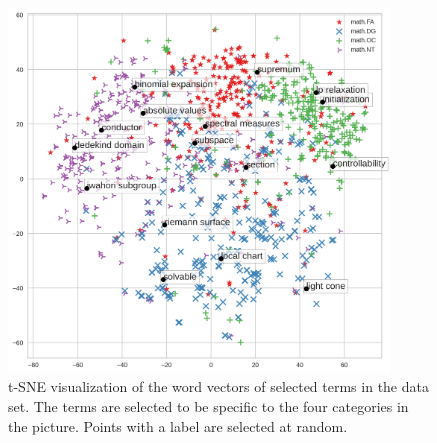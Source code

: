 \documentclass[submission,copyright,creativecommons]{eptcs}
\begin{document}
\begin{figure}
    \centering
    \includegraphics[width=0.9\textwidth]{m80p300opt135.png}
    \caption{\label{scatter} t-SNE visualization of the word vectors
        of selected terms in the data set. The terms are selected to be specific to 
        the four categories in the picture.  Points with a label are selected
    at random.}
\end{figure}
  



\end{document}
